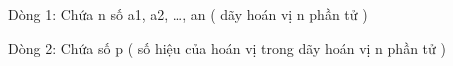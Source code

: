 Dòng 1: Chứa n số a1, a2, …, an ( dãy hoán vị n phần tử )  

   Dòng 2: Chứa số p ( số hiệu của hoán vị trong dãy hoán vị n phần tử )  

\